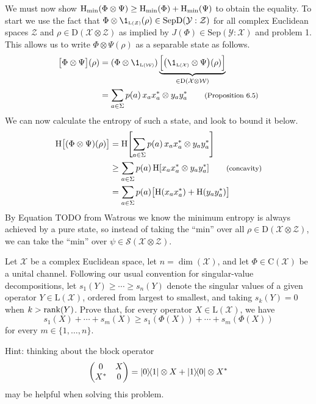 \documentclass[boxes,pages,color=SeaGreen]{homework}
\renewcommand{\op}[1]{\operatorname{#1}}
\newcommand{\X}{\mathcal{X}}
\newcommand{\Y}{\mathcal{Y}}
\newcommand{\Z}{\mathcal{Z}}
\newcommand{\W}{\mathcal{W}}
\newcommand{\smalltag}[1]{\tag*{\footnotesize (#1)}}
\newcommand{\Lin}{\mathrm{L}}
\newcommand{\Density}{\mathrm{D}}
\newcommand{\Channel}{\mathrm{C}}
\newcommand{\Sep}{\mathrm{Sep}}
\newcommand{\SepD}{\mathrm{SepD}}
\begin{document}
\begin{solution}
  We must now show $\op{H}_{\text{min}}(\Phi\otimes\Psi) \geq \op{H}_{\text{min}}(\Phi) + \op{H}_{\textup{min}}(\Psi)$ to obtain the equality.
  To start we use the fact that $\Phi\otimes\1_{\mathsmaller{\Lin(\Z)}}(\rho) \in \SepD(\Y:\Z)$ for all complex Euclidean spaces $\Z$ and $\rho\in\Density(\X\otimes\Z)$ as implied by $J(\Phi)\in\Sep(\Y:\X)$ and problem 1.
  This allows us to write $\Phi\otimes\Psi(\rho)$ as a separable state as follows.
  \begin{align*}
    \qty\big[\Phi\otimes\Psi](\rho) & = (\Phi\otimes\1_\mathsmaller{\Lin(\W)})\underbrace{\qty\Big[\qty\big(\1_\mathsmaller{\Lin(\X)}\otimes\Psi)(\rho)]}_{\in\Density(\X\otimes\W)} \\
                                    & = \sum_{a\in\Sigma} p(a)\, x_a x_a^* \otimes y_a y_a^* \smalltag{Proposition 6.5}
  \end{align*}
  We can now calculate the entropy of such a state, and look to bound it below.
  \begin{align*}
    \op{H}\!\qty\big[\qty(\Phi\otimes\Psi)(\rho)] & = \op{H}\!\qty[\sum_{a\in\Sigma}p(a)\, x_a x_a^*\otimes y_a y_a^*]                      \\
                                                  & \geq \sum_{a\in\Sigma}p(a)\op{H}\!\qty[x_a x_a^*\otimes y_a y_a^*] \smalltag{concavity} \\
                                                  & = \sum_{a\in\Sigma}p(a)\qty\big[\op{H}(x_a x_a^*) + \op{H}(y_a y_a^*)]
  \end{align*}
  By Equation TODO from Watrous we know the minimum entropy is always achieved by a pure state, so instead of taking the ``min'' over all $\rho\in\Density(\X\otimes\Z)$, we can take the ``min'' over $\psi\in\mathcal{S}(\X\otimes\Z)$.
\end{solution}

\begin{problem}
Let $\X$ be a complex Euclidean space, let $n = \dim(\X)$, and let
$\Phi\in\Channel(\X)$ be a unital channel.
Following our usual convention for singular-value decompositions, let
$s_1(Y) \geq \cdots \geq s_n(Y)$ denote the singular values of a given
operator $Y\in\Lin(\X)$, ordered from largest to smallest, and taking
$s_k(Y) = 0$ when $k > \rank(Y)$.
Prove that, for every operator $X\in\Lin(\X)$, we have
\[
  s_1(X) + \cdots + s_m(X) \geq s_1(\Phi(X)) + \cdots + s_m(\Phi(X))
\]
for every $m \in \{1,\ldots,n\}$.

Hint: thinking about the block operator
\[
  \mqty(
  0   & X \\
  X^* & 0
  )
  = \ketbra{0}{1} \otimes X + \ketbra{1}{0} \otimes X^*
\]
may be helpful when solving this problem.
\end{problem}
\end{document}
